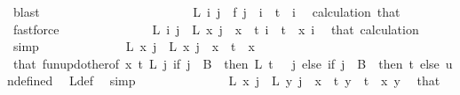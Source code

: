 \begin{isabellebody}
\ blast\isanewline
\isanewline
\ \ \ \ \ \ \ \ \ \ \isamarkupfalse%
\isanewline
\ \ \ \ \ \ \ \ \ \ \isamarkupfalse%
\ \isamarkupfalse%
\ {\isachardoublequoteopen}L\ i\ j\ {\isacharequal}{\kern0pt}\ f\ j{\isachardoublequoteclose}\ \ {\isachardoublequoteopen}i\ {\isacharless}{\kern0pt}\ t{\isachardoublequoteclose}\ \ i\ \isamarkupfalse%
\ calculation\ that\ \isamarkupfalse%
\ fastforce\isanewline
\ \ \ \ \ \ \ \ \ \ \isamarkupfalse%
\ \isamarkupfalse%
\ \ {\isachardoublequoteopen}L\ i\ j\ {\isacharequal}{\kern0pt}\ L\ x\ j{\isachardoublequoteclose}\ \ {\isachardoublequoteopen}x\ {\isacharless}{\kern0pt}\ t{\isachardoublequoteclose}\ {\isachardoublequoteopen}i\ {\isacharless}{\kern0pt}\ t{\isachardoublequoteclose}\ \ x\ i\ \isamarkupfalse%
\ that\ calculation\ \isamarkupfalse%
\ simp\isanewline
\isanewline
\ \ \ \ \ \ \ \ \ \ \isamarkupfalse%
\ \isamarkupfalse%
\ {\isachardoublequoteopen}L{\isacharprime}{\kern0pt}\ x\ j\ {\isacharequal}{\kern0pt}\ L\ x\ j{\isachardoublequoteclose}\ \ {\isachardoublequoteopen}x\ {\isacharless}{\kern0pt}\ t{\isachardoublequoteclose}\ \ x\ \isamarkupfalse%
\ that\ fun{\isacharunderscore}{\kern0pt}upd{\isacharunderscore}{\kern0pt}other{\isacharbrackleft}{\kern0pt}of\ x\ t\ L\ {\isachardoublequoteopen}{\isasymlambda}j{\isachardot}{\kern0pt}\ if\ j\ {\isasymin}\ B\ {}\ then\ L\ {\isacharparenleft}{\kern0pt}t\ {\isacharminus}{\kern0pt}\ {}{\isacharparenright}{\kern0pt}\ j\ else\ if\ j\ {\isasymin}\ B\ {}\ then\ t\ else\ undefined{\isachardoublequoteclose}{\isacharbrackright}{\kern0pt}\ \isamarkupfalse%
\ L{\isacharprime}{\kern0pt}{\isacharunderscore}{\kern0pt}def\ \isamarkupfalse%
\ simp\isanewline
\ \ \ \ \ \ \ \ \ \ \isamarkupfalse%
\ \isamarkupfalse%
\ {\isacharasterisk}{\kern0pt}{\isacharcolon}{\kern0pt}\ {\isachardoublequoteopen}L{\isacharprime}{\kern0pt}\ x\ j\ {\isacharequal}{\kern0pt}\ L{\isacharprime}{\kern0pt}\ y\ j{\isachardoublequoteclose}\ \ {\isachardoublequoteopen}x\ {\isacharless}{\kern0pt}\ t{\isachardoublequoteclose}\ {\isachardoublequoteopen}y\ {\isacharless}{\kern0pt}\ t{\isachardoublequoteclose}\ \ x\ y\ \isamarkupfalse%
\ that\ \isamarkupfalse%

\end{isabellebody}

